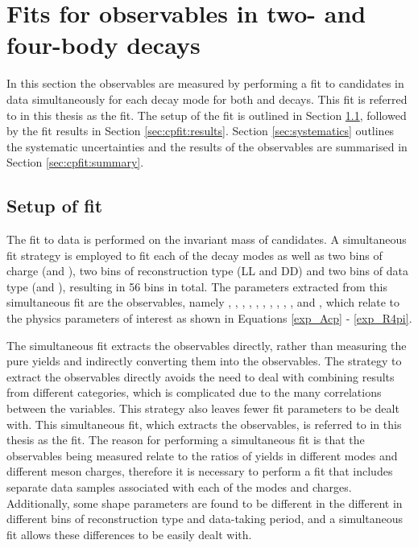 \clearpage
%

\chapter{\label{ch:5-cpfit}Fits for \CP observables in two- and four-body decays} 


In this section the \CP observables are measured by performing a fit to \btodkst candidates in data simultaneously for each \Dz decay mode for both \Bp and \Bm decays. This fit is referred to in this thesis as the \CP fit. The setup of the \CP fit is outlined in Section \ref{sec:cpfit:setup}, followed by the fit results in Section \ref{sec:cpfit:results}. Section \ref{sec:systematics} outlines the systematic uncertainties and the results of the \CP observables are summarised in Section \ref{sec:cpfit:summary}.

\section{Setup of \CP fit}
\label{sec:cpfit:setup}

The fit to data is performed on the invariant mass of \btodkst candidates. A simultaneous fit strategy is employed to fit each of the \Dz decay modes as well as two bins of \B charge (\Bp and \Bm), two bins of \KS reconstruction type (LL and DD) and two bins of data type (\runone and \runtwo), resulting in 56 bins in total. The parameters extracted from this simultaneous fit are the \CP observables, namely \Akpi, \Akk, \Apipi, \Rkk, \Rpipi, \Rptwo, \Rmtwo, \Akpipipi, \Apipipipi, \Rpipipipi, \Rpfour and \Rmfour, which relate to the physics parameters of interest as shown in Equations \ref{exp_Acp} - \ref{exp_R4pi}.

The simultaneous fit extracts the \CP observables directly, rather than measuring the pure yields and indirectly converting them into the \CP observables. The strategy to extract the \CP observables directly avoids the need to deal with combining results from different categories, which is complicated due to the many correlations between the variables. This strategy also leaves fewer fit parameters to be dealt with. This simultaneous fit, which extracts the \CP observables, is referred to in this thesis as the \CP fit. The reason for performing a simultaneous fit is that the \CP observables being measured relate to the ratios of yields in different \Dz modes and different \B meson charges, therefore it is necessary to perform a fit that includes separate data samples associated with each of the modes and charges. Additionally, some shape parameters are found to be different in the different in different bins of \KS reconstruction type and data-taking period, and a simultaneous fit allows these differences to be easily dealt with. 

